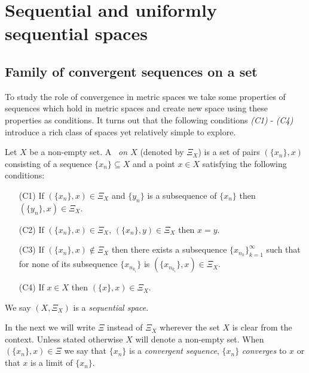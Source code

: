 \chapter{Sequential and uniformly sequential spaces}

\section{Family of convergent sequences on a set}

To study the role of convergence in metric spaces we take some properties of sequences which hold in metric spaces and create new space using these properties as conditions. It turns out that the following conditions \emph{(C1)} - \emph{(C4)} introduce a rich class of spaces yet relatively simple to explore. 

\begin{define}\label{def:fcs}
Let $X$ be a non-empty set. A \emph{\fcs\ on $X$} (denoted by $\Xi_X$) is a set of pairs $(\{x_n\},x)$ consisting of a sequence $\{x_n\}\subseteq X$ and a point $x\in X$ satisfying the following conditions:
\begin{enumerate}
	\item[(C1)] If $(\{x_n\},x)\in\Xi_X$ and $\{y_n\}$ is a subsequence of $\{x_n\}$ then $(\{y_n\},x)\in\Xi_X$.
	\item[(C2)] If $(\{x_n\},x)\in\Xi_X$, $(\{x_n\},y)\in\Xi_X$ then $x=y$.
	\item[(C3)] If  $(\{x_n\},x)\notin\Xi_X$ then there exists a subsequence $\{x_{n_k}\}^\infty_{k=1}$ such that for none of its subsequence $\{x_{n_{k_i}}\}$ is $(\{x_{n_{k_i}}\},x)\in\Xi_X$.
	\item[(C4)] If $x\in X$ then $(\{x\},x)\in\Xi_X$.
\end{enumerate}
We say $(X,\Xi_X)$ is a \emph{sequential space}.
\end{define}

In the next we will write $\Xi$ instead of $\Xi_X$ wherever the set $X$ is clear from the context. Unless stated otherwise $X$ will denote a non-empty set. When $(\{x_n\},x)\in\Xi$ we say that $\{x_n\}$ is  a \emph{convergent sequence}, $\{x_n\}$ \emph{converges} to $x$ or that $x$ is a limit of  $\{x_n\}$.

